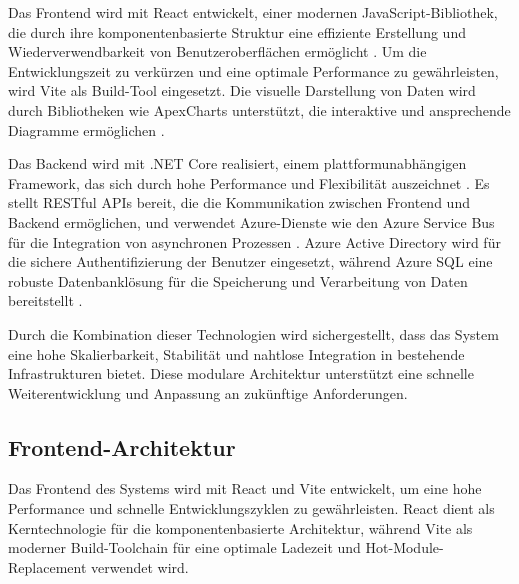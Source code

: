 Das Frontend wird mit React entwickelt, einer modernen JavaScript-Bibliothek, die durch ihre komponentenbasierte Struktur eine effiziente Erstellung und Wiederverwendbarkeit von Benutzeroberflächen ermöglicht \cite{stefanov2021react}. Um die Entwicklungszeit zu verkürzen und eine optimale Performance zu gewährleisten, wird Vite als Build-Tool eingesetzt. Die visuelle Darstellung von Daten wird durch Bibliotheken wie ApexCharts unterstützt, die interaktive und ansprechende Diagramme ermöglichen \cite{apexchartsDoc}.

Das Backend wird mit .NET Core realisiert, einem plattformunabhängigen Framework, das sich durch hohe Performance und Flexibilität auszeichnet \cite{microsoftDotNet}. Es stellt RESTful APIs bereit, die die Kommunikation zwischen Frontend und Backend ermöglichen, und verwendet Azure-Dienste wie den Azure Service Bus für die Integration von asynchronen Prozessen \cite{azureServiceBus}. Azure Active Directory wird für die sichere Authentifizierung der Benutzer eingesetzt, während Azure SQL eine robuste Datenbanklösung für die Speicherung und Verarbeitung von Daten bereitstellt \cite{azureDocumentation}.

Durch die Kombination dieser Technologien wird sichergestellt, dass das System eine hohe Skalierbarkeit, Stabilität und nahtlose Integration in bestehende Infrastrukturen bietet. Diese modulare Architektur unterstützt eine schnelle Weiterentwicklung und Anpassung an zukünftige Anforderungen.


\subsection{Frontend-Architektur}

Das Frontend des Systems wird mit React und Vite entwickelt, um eine hohe Performance und schnelle Entwicklungszyklen zu gewährleisten. React dient als Kerntechnologie für die komponentenbasierte Architektur, während Vite als moderner Build-Toolchain für eine optimale Ladezeit und Hot-Module-Replacement verwendet wird.

